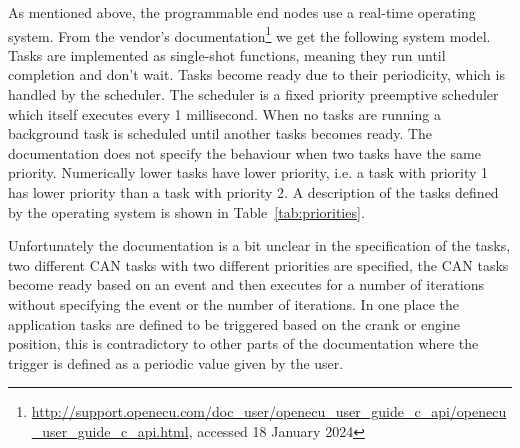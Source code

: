\label{subsec:programmablenode}
As mentioned above, the programmable end nodes use a real-time operating system. From the vendor's documentation\footnote{\url{http://support.openecu.com/doc_user/openecu_user_guide_c_api/openecu_user_guide_c_api.html}, accessed 18 January 2024} we get the following system model. Tasks are implemented as single-shot functions, meaning they run until completion and don't wait. Tasks become ready due to their periodicity, which is handled by the scheduler. The scheduler is a fixed priority preemptive scheduler which itself executes every 1 millisecond. When no tasks are running a background task is scheduled until another tasks becomes ready. The documentation does not specify the behaviour when two tasks have the same priority. Numerically lower tasks have lower priority, i.e. a task with priority 1 has lower priority than a task with priority 2. A description of the tasks defined by the operating system is shown in Table~\ref{tab:priorities}. 



Unfortunately the documentation is a bit unclear in the specification of the tasks, two different CAN tasks with two different priorities are specified, the CAN tasks become ready based on an event and then executes for a number of iterations without specifying the event or the number of iterations. In one place the application tasks are defined to be triggered based on the crank or engine position, this is contradictory to other parts of the documentation where the trigger is defined as a periodic value given by the user. 


